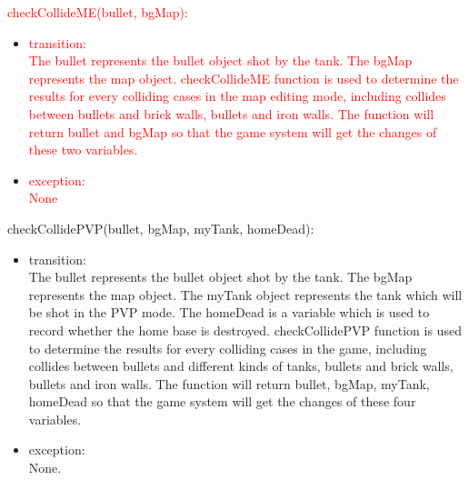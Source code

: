 \documentclass[12pt, titlepage]{article}
\begin{document}
	    \textcolor{red}{checkCollideME(bullet, bgMap):}
	    \begin{itemize}
	    \item \textcolor{red}{transition:}\\
	    \textcolor{red}{The bullet represents the bullet object shot by the tank. The bgMap represents the map object. checkCollideME function is used to determine the results for every colliding cases in the map editing mode, including collides between bullets and brick walls, bullets and iron walls. The function will return bullet and bgMap so that the game system will get the changes of these two variables.}\\
	    
	    \item \textcolor{red}{exception:\\ None}
	    \end{itemize}
	    
	    
	    checkCollidePVP(bullet, bgMap, myTank, homeDead):
	    \begin{itemize}
	    \item transition:\\
	    The bullet represents the bullet object shot by the tank. The bgMap represents the map object. The myTank object represents the tank which will be shot in the PVP mode. The homeDead is a variable which is used to record whether the home base is destroyed. checkCollidePVP function is used to determine the results for every colliding cases in the game, including collides between bullets and different kinds of tanks, bullets and brick walls, bullets and iron walls. The function will return bullet, bgMap, myTank, homeDead so that the game system will get the changes of these four variables.\\
	    
	    \item exception:\\ None.
	    \end{itemize}
	    
\end{document}
